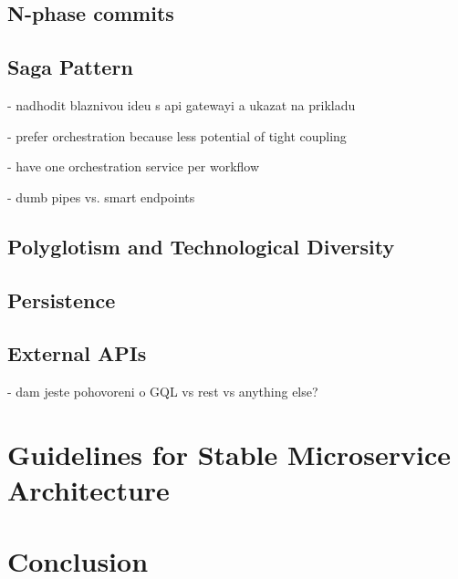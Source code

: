 \documentclass[thesis=M,english,hidelinks]{FITthesis}[2012/10/20]
\begin{document}
\section{N-phase commits}
\label{sec:appl:nphase}

\section{Saga Pattern}
\label{sec:appl:saga}

- nadhodit blaznivou ideu s api gatewayi a ukazat na prikladu

- prefer orchestration because less potential of tight coupling

- have one orchestration service per workflow

- dumb pipes vs. smart endpoints





\section{Polyglotism and Technological Diversity}

\section{Persistence}

\section{External APIs}
- dam jeste pohovoreni o GQL vs rest vs anything else?

% 
% 
\chapter{Guidelines for Stable Microservice Architecture}
\label{sec:guidelines}






% 
% 
\chapter{Conclusion}
\label{sec:conclusion}
\end{document}
